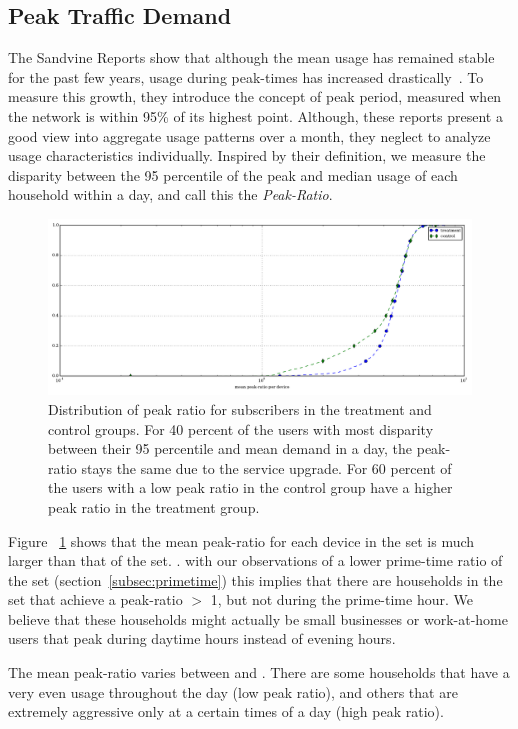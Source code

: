 \subsection{Peak Traffic Demand}\label{subsec:peakratio}

The Sandvine Reports show that although the mean usage has remained
stable for the past few years, usage during peak-times has increased
drastically~\cite{sandvine20141h}. To measure this growth, they introduce the
concept of peak period, measured when the network is within 95\% of its highest 
point. Although, these reports present a good view into aggregate usage 
patterns over a month,
they neglect to analyze usage characteristics individually. Inspired by their
definition, we measure the disparity between the 95 percentile of the peak and 
median
usage of each household within a day, and call this the \emph{Peak-Ratio}.


\begin{figure}[t]
\begin{minipage}{1\linewidth}
\centering
\includegraphics[width=1\linewidth]{figures/peakratio-CDF-devices-MEAN.pdf}
\caption{Distribution of peak ratio for subscribers in the treatment and 
control groups. For 40 percent of the users with most disparity between their
95 percentile and mean demand in a day, the peak-ratio stays the same due to 
the service upgrade. For 60 percent of the users with a low peak ratio in the 
control group have a higher peak ratio in the treatment group. }
\label{fig:CDF-peak-ratio-mean}
\end{minipage}
\end{figure}

Figure ~\ref{fig:CDF-peak-ratio-mean} shows that the mean peak-ratio for each 
device in the \test set is much larger than that of the \control set.
.
 with our observations of a lower prime-time ratio of the  
\test set (section~\ref{subsec:primetime}) this implies that there are 
households in the \test set that achieve a peak-ratio $>$ 1, but not during the 
prime-time hour. We believe that these households might actually be small 
businesses or work-at-home users that peak during daytime hours instead of 
evening hours.

The mean peak-ratio varies between  and . There are 
some households that have a very even usage throughout the day (low peak ratio), 
and others that are extremely aggressive only at a certain times of a day (high 
peak ratio).